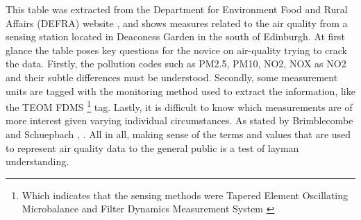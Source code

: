 This table was extracted from the  Department for Environment Food and Rural Affairs (DEFRA) website \cite{DepartmentforEnvironmenta}, and shows measures related to the air quality from a sensing station located in Deaconess Garden in the south of Edinburgh. At first glance the table poses key questions for the novice on air-quality trying to crack the data. Firstly, the pollution codes such as PM2.5, PM10, NO2, NOX as NO2 and their subtle differences must be understood. Secondly, some measurement units are tagged with the monitoring method used to extract the information, like the TEOM FDMS \footnote{Which indicates that the sensing methods were Tapered Element Oscillating Microbalance and Filter Dynamics Measurement System \cite{Quality2005}} tag. Lastly, it is difficult to know which measurements are of more interest given varying individual circumstances. As stated by Brimblecombe and Schuepbach \cite{P.Brimblecombe2008}, .  All in all, making sense of the terms and values that are used to represent air quality data to the general public is a test of layman understanding.
